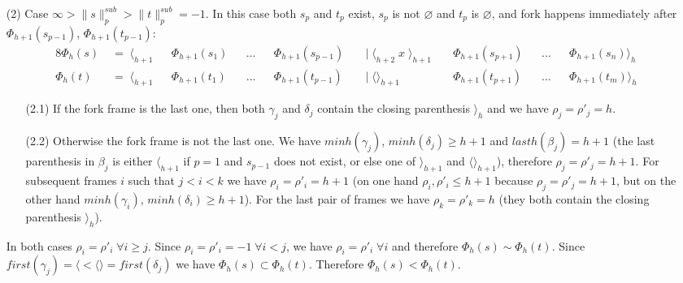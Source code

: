 \documentclass[AMA,STIX1COL]{WileyNJD-v2}
\newcommand{\Xl}{\langle}
\newcommand{\Xr}{\rangle}
\newcommand{\Xm}{\langle\!\rangle}
\newcommand{\snorm}[2]{\|{#1}\|^{sub}_{#2}}
\begin{document}
\begin{proofEnd}
\begin{itemize}[itemsep=0.5em, topsep=0.5em]
    \item[(2)]
        Case $\infty > \snorm{s}{p} > \snorm{t}{p} = -1$.
        In this case both $s_p$ and $t_p$ exist,
        $s_p$ is not $\varnothing$ and $t_p$ is $\varnothing$,
        and fork happens immediately after $\Phi_{h+1}(s_{p-1})$, $\Phi_{h+1}(t_{p-1})$:
        \begin{alignat*}{8}
            \Phi_{h}(s) &\;=\; \Xl_{h+1} &&\Phi_{h+1}(s_1) &&\dots &&\Phi_{h+1}(s_{p-1})
                &&\;\big|\; \Xl_{h+2} \; x \; \Xr_{h+1} \; &&\Phi_{h+1}(s_{p+1}) &&\dots &&\Phi_{h+1}(s_n) \Xr_{h} \\[-0.5em]
            \Phi_{h}(t) &\;=\; \Xl_{h+1} &&\Phi_{h+1}(t_1) &&\dots &&\Phi_{h+1}(t_{p-1})
                &&\;\big|\; \Xm_{h+1} \;\;\;\;\;\;         &&\Phi_{h+1}(t_{p+1}) &&\dots &&\Phi_{h+1}(t_m) \Xr_{h}
        \end{alignat*}
        \begin{itemize}
        \item[(2.1)]
            If the fork frame is the last one,
            then both $\gamma_j$ and $\delta_j$ contain the closing parenthesis $\Xr_{h}$
            and we have $\rho_j = \rho'_j = h$.

        \item[(2.2)]
            Otherwise the fork frame is not the last one.
            We have $minh(\gamma_j)$, $minh(\delta_j) \geq h + 1$
            and $lasth (\beta_j) = h + 1$
            (the last parenthesis in $\beta_j$ is either $\Xl_{h+1}$ if $p = 1$ and $s_{p-1}$ does not exist,
            or else one of $\Xr_{h+1}$ and $\Xm_{h+1}$),
            therefore $\rho_j = \rho'_j = h + 1$.
            For subsequent frames $i$ such that $j < i < k$ we have $\rho_i = \rho'_i = h + 1$
            (on one hand $\rho_i, \rho'_i \leq h + 1$ because $\rho_j = \rho'_j = h + 1$,
            but on the other hand $minh(\gamma_i)$, $minh(\delta_i) \geq h + 1$).
            For the last pair of frames we have $\rho_k = \rho'_k = h$ (they both contain the closing parenthesis $\Xr_{h}$).
        \end{itemize}

        In both cases $\rho_i = \rho'_i \;\forall i \geq j$.
        Since $\rho_i = \rho'_i = -1 \;\forall i < j$,
        we have $\rho_i = \rho'_i \;\forall i$ and therefore $\Phi_{h}(s) \sim \Phi_{h}(t)$.
        Since $first (\gamma_j) = \Xl < \Xm = first (\delta_j)$ we have $\Phi_{h}(s) \subset \Phi_{h}(t)$.
        Therefore $\Phi_{h}(s) < \Phi_{h}(t)$.


\end{itemize}
\end{proofEnd}
\end{document}
